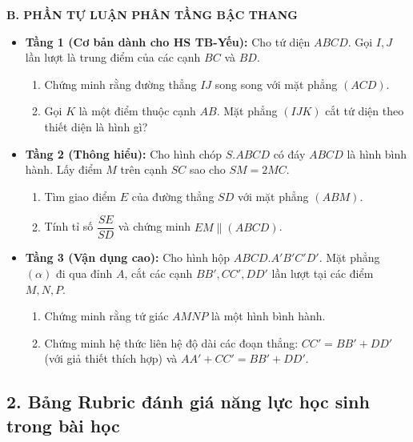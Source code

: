 \documentclass[12pt, a4paper]{article}
\begin{document}
\noindent \textbf{B. PHẦN TỰ LUẬN PHÂN TẦNG BẬC THANG}
\begin{itemize}[leftmargin=0.6cm]
    \item \textbf{Tầng 1 (Cơ bản dành cho HS TB-Yếu):}
    Cho tứ diện $ABCD$. Gọi $I, J$ lần lượt là trung điểm của các cạnh $BC$ và $BD$.
    \begin{enumerate}[leftmargin=0.5cm]
        \item Chứng minh rằng đường thẳng $IJ$ song song với mặt phẳng $(ACD)$.
        \item Gọi $K$ là một điểm thuộc cạnh $AB$. Mặt phẳng $(IJK)$ cắt tứ diện theo thiết diện là hình gì?
    \end{enumerate}

    \item \textbf{Tầng 2 (Thông hiểu):}
    Cho hình chóp $S.ABCD$ có đáy $ABCD$ là hình bình hành. Lấy điểm $M$ trên cạnh $SC$ sao cho $SM = 2MC$.
    \begin{enumerate}[leftmargin=0.5cm]
        \item Tìm giao điểm $E$ của đường thẳng $SD$ với mặt phẳng $(ABM)$.
        \item Tính tỉ số $\dfrac{SE}{SD}$ và chứng minh $EM \parallel (ABCD)$.
    \end{enumerate}

    \item \textbf{Tầng 3 (Vận dụng cao):}
    Cho hình hộp $ABCD.A'B'C'D'$. Mặt phẳng $(\alpha)$ đi qua đỉnh $A$, cắt các cạnh $BB', CC', DD'$ lần lượt tại các điểm $M, N, P$.
    \begin{enumerate}[leftmargin=0.5cm]
        \item Chứng minh rằng tứ giác $AMNP$ là một hình bình hành.
        \item Chứng minh hệ thức liên hệ độ dài các đoạn thẳng: $CC' = BB' + DD'$ (với giả thiết thích hợp) và $AA' + CC' = BB' + DD'$.
    \end{enumerate}
\end{itemize}

\subsection*{2. Bảng Rubric đánh giá năng lực học sinh trong bài học}
\end{document}

